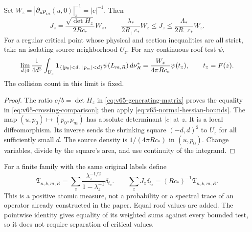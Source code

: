 \begin{proposition}
\label{prop:v65-normal-crossing}
Set $W_z=|\partial_u p_m(u,0)|_z^{-1}=|c|^{-1}$. Then
\begin{equation}\label{eq:v65-crossing-comparison}
 J_z=\frac{\sqrt{\det H_z}}{2R c_*}W_z,
 \qquad
 \frac{\lambda_*}{2R_+c_*}W_z\le J_z
       \le\frac{\Lambda_*}{2R_-c_*}W_z.
\end{equation}
For a regular critical point whose physical and section inequalities
are all strict, take an isolating source neighborhood $U_z$.
For any continuous roof test $\psi$,
\begin{equation}\label{eq:v65-normal-trace-limit}
 \lim_{d\downarrow0}\frac{1}{4d^2}
 \int_{U_z}\one_{\{|p_0|<d,\ |p_m|<d\}}
             \psi(L_{m,R})\,d\nu_R^*
       =\frac{W_z}{4\pi R c_*}\psi(t_z),\qquad t_z=F(z).
\end{equation}
The collision count in this limit is fixed.
\end{proposition}
\begin{proof}
The ratio $c/b=\det H_z$ in
\eqref{eq:v65-generating-matrix} proves the equality in
\eqref{eq:v65-crossing-comparison}; then apply
\eqref{eq:v65-normal-hessian-bounds}. The map
$(u,p_0)\mapsto(p_0,p_m)$ has absolute determinant $|c|$ at $z$.
It is a local diffeomorphism. Its inverse sends the shrinking square
$(-d,d)^2$ to $U_z$ for all sufficiently small $d$. The source
density is $1/(4\pi R c_*)$ in $(u,p_0)$. Change variables,
divide by the square's area, and use continuity of the integrand.
\end{proof}

For a finite family with the same original labels define
\begin{equation}\label{eq:v65-reversible-atomic-measure}
 \mathfrak T_{n,k,m,R}
   =\sum_z\frac{\lambda_z^{-1/2}}{1-\lambda_z^{-1}}\delta_{t_z}.
 \qquad
 \sum_zJ_z\delta_{t_z}=(R c_*)^{-1}\mathfrak T_{n,k,m,R}.
\end{equation}
This is a positive atomic measure, not a probability or a spectral
trace of an operator already constructed in the paper. Equal roof
values are added. The pointwise identity gives equality of its
weighted sums against every bounded test, so it does not require
separation of critical values.


